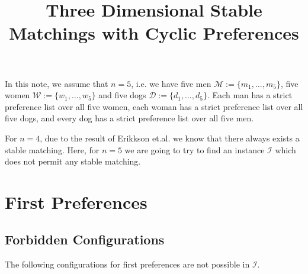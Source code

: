 \documentclass[3p,times]{amsart}
\begin{document}
\title{Three Dimensional Stable Matchings with Cyclic Preferences}

\maketitle

In this note, we assume that $n=5$, i.e. we have five men $\mathcal{M}:=\{m_1, \ldots, m_5\}$, five women $\mathcal{W}:=\{w_1, \ldots, w_5\}$ and five dogs $\mathcal{D}:=\{d_1, \ldots, d_5\}$. Each man has a strict preference list over all five women, each woman has a strict preference list over all five dogs, and every dog has a strict preference list over all five men.

For $n=4$, due to the result of Erikkson et.al. we know that there always exists a stable matching. Here, for $n=5$ we are going to try to find an instance $\mathcal{I}$ which does not permit any stable matching.

\section{First Preferences}

\subsection{Forbidden Configurations}
The following configurations for first preferences are not possible in $\mathcal{I}$.
\end{document}
